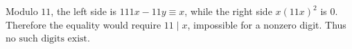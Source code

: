 Modulo $11$, the left side is $111x-11y\equiv x$, while the right side $x(11x)^2$ is $0$. Therefore the equality would require $11\mid x$, impossible for a nonzero digit. Thus $\boxed{\text{no such digits exist}}$.
